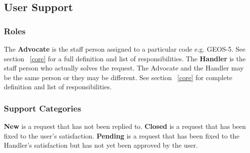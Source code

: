\subsection{User Support}
\label{sec:usr_support}

\subsubsection{Roles}
The {\bf Advocate} is the staff person assigned to a particular code e.g. GEOS-5. See section ~\ref{core} for a full definition and list of responsibilities. 
The {\bf Handler} is the staff person who actually solves the request. The Advocate and the Handler may be the same person or they may be different. See section ~\ref{core} for complete definition and list of responsibilities.

\subsubsection{Support Categories}
{\bf New} is a request that has not been replied to.
{\bf Closed} is a request that has been fixed to the user's satisfaction.
{\bf Pending} is a request that has been fixed to the Handler's satisfaction but has not yet been approved by the user.

